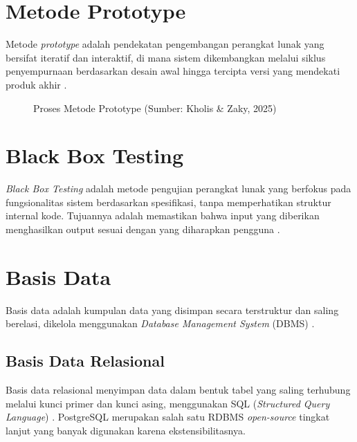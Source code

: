 \section{Metode Prototype}
Metode \textit{prototype} adalah pendekatan pengembangan perangkat lunak yang
bersifat iteratif dan interaktif, di mana sistem dikembangkan melalui siklus
penyempurnaan berdasarkan desain awal hingga tercipta versi yang mendekati
produk akhir \cite{Kholis2025}.

\begin{figure}[H]
  \centering
  \caption{Proses Metode Prototype (Sumber: Kholis \& Zaky, 2025)}
  \label{fig:prototype}
\end{figure}

\section{Black Box Testing}
\textit{Black Box Testing} adalah metode pengujian perangkat lunak yang berfokus pada
fungsionalitas sistem berdasarkan spesifikasi, tanpa memperhatikan struktur internal kode.
Tujuannya adalah memastikan bahwa input yang diberikan menghasilkan output sesuai
dengan yang diharapkan pengguna \cite{Wicaksana2025}.

\section{Basis Data}
Basis data adalah kumpulan data yang disimpan secara terstruktur dan saling berelasi,
dikelola menggunakan \textit{Database Management System} (DBMS) \cite{Santika2023}.

\subsection{Basis Data Relasional}
Basis data relasional menyimpan data dalam bentuk tabel yang saling terhubung melalui
kunci primer dan kunci asing, menggunakan SQL (\textit{Structured Query Language})
\cite{Watizega2024}. PostgreSQL merupakan salah satu RDBMS \textit{open-source} tingkat lanjut yang banyak digunakan karena ekstensibilitasnya.

